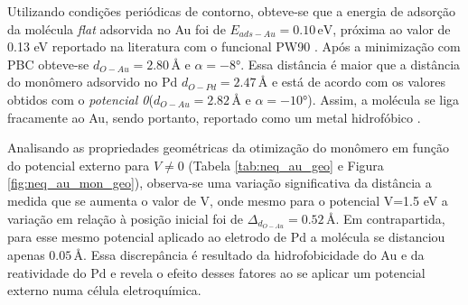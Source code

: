 Utilizando condições periódicas de contorno, obteve-se que a energia de adsorção da molécula \textit{flat} adsorvida no Au foi de $ E_{ads-Au}=0.10\,\si{\eV}  $, próxima ao valor de 0.13 eV reportado na literatura com o funcional PW90 \cite{michaedelis}. Após a minimização com PBC obteve-se $d_{O-Au}=2.80\,\si{\angstrom} $ e $ \alpha=-8\si{\degree} $. Essa distância é maior que a distância do monômero adsorvido no Pd $ d_{O-Pd} =2.47 \,\si{\angstrom}$ e está de acordo com os valores obtidos com o \textit{potencial 0}($d_{O-Au}=2.82\,\si{\angstrom} $ e $ \alpha=-10\si{\degree} $). Assim, a molécula se liga fracamente ao Au, sendo portanto, reportado como um metal hidrofóbico \cite{monomer}. 

Analisando as propriedades geométricas da otimização do monômero em função do potencial externo para $ V\neq0 $ (Tabela \ref{tab:neq_au_geo} e Figura \ref{fig:neq_au_mon_geo}), observa-se uma variação significativa da distância a medida que se aumenta o valor de V, onde mesmo para o potencial V=1.5 eV a variação em relação à posição inicial foi de $ \Delta_{d_{O-Au}}=0.52\,\si{\angstrom} $. Em contrapartida, para esse mesmo potencial aplicado ao eletrodo de Pd a molécula se distanciou apenas $ 0.05 \,\si{\angstrom} $. Essa discrepância é resultado da hidrofobicidade do Au e da reatividade do Pd e revela o efeito desses fatores ao se aplicar um potencial externo numa célula eletroquímica.

 

